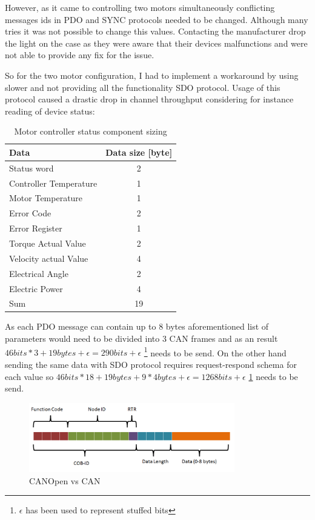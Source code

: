 However, as it came to controlling two motors simultaneously conflicting messages ids in PDO and SYNC protocols needed to be changed. Although many tries it was not possible to change this values. Contacting the manufacturer drop the light on the case as they were aware that their devices malfunctions and were not able to provide any fix for the issue.

So for the two motor configuration, I had to implement a workaround by using slower and not providing all the functionality SDO protocol.
Usage of this protocol caused a drastic drop in channel throughput considering for instance reading of device status:
\begin{table}[H]
\centering
\begin{tabular}{|l|c|}
    \hline
    Data & Data size [byte] \\
    \hline
    Status word & 2 \\
    Controller Temperature & 1 \\
    Motor Temperature & 1 \\
    Error Code & 2  \\
    Error Register & 1 \\
    Torque Actual Value & 2  \\
    Velocity actual Value & 4  \\
    Electrical Angle & 2  \\
    Electric Power & 4 \\
    \hline
    \hfill Sum & 19 \\
    \hline
\end{tabular}
\caption{Motor controller status component sizing}
\end{table}

As each PDO message can contain up to 8 bytes aforementioned list of parameters would need to be divided into 3 CAN frames and as an result $46bits*3+19bytes+\epsilon = 290 bits +\epsilon$  \hspace{0.2cm}\footnote{\label{foot:eps}$\epsilon$ has been used to represent stuffed bits} needs to be send. On the other hand sending the same data with SDO protocol requires request-respond schema for each value so $46bits*18 + 19bytes + 9*4bytes + \epsilon = 1268 bits + \epsilon$ \hspace{0.2cm} \ref{foot:eps} needs to be send.

\begin{figure}[h]
    \centering
    \includegraphics[width=0.8\textwidth]{figures/CANOpen vs CAN.png}
    \caption{CANOpen vs CAN}
    \label{fig:canopen_bitwise}
\end{figure}

